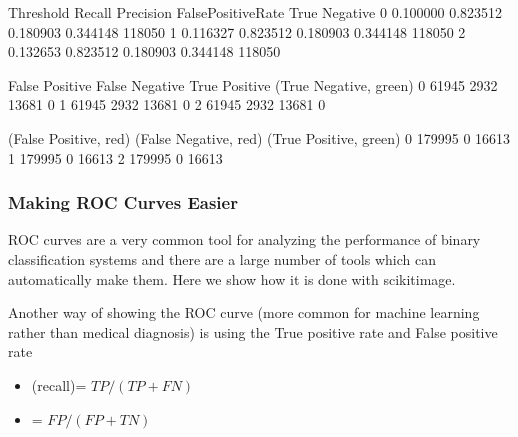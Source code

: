 \documentclass[letterpaper,10pt,english]{sphinxmanual}
\begin{document}
\begin{sphinxVerbatim}[commandchars=\\\{\}]
  
\end{sphinxVerbatim}

\begin{sphinxVerbatim}[commandchars=\\\{\}]
   Threshold    Recall  Precision  False\PYGZus{}Positive\PYGZus{}Rate  True Negative  \PYGZbs{}
0   0.100000  0.823512   0.180903             0.344148         118050   
1   0.116327  0.823512   0.180903             0.344148         118050   
2   0.132653  0.823512   0.180903             0.344148         118050   

   False Positive  False Negative  True Positive  (True Negative, green)  \PYGZbs{}
0           61945            2932          13681                       0   
1           61945            2932          13681                       0   
2           61945            2932          13681                       0   

   (False Positive, red)  (False Negative, red)  (True Positive, green)  
0                 179995                      0                   16613  
1                 179995                      0                   16613  
2                 179995                      0                   16613  
\end{sphinxVerbatim}


\subsubsection{Making ROC Curves Easier}
\label{\detokenize{04-BasicSegmentation_Part2:making-roc-curves-easier}}
\sphinxAtStartPar
ROC curves are a very common tool for analyzing the performance of binary classification systems and there are a large number of tools which can automatically make them. Here we show how it is done with scikit\sphinxhyphen{}image.

\sphinxAtStartPar
Another way of showing the ROC curve (more common for machine learning rather than medical diagnosis) is using the True positive rate and False positive rate
\begin{itemize}
\item {} 
\sphinxAtStartPar
{} (recall)= \(TP/(TP+FN)\)

\item {} 
\sphinxAtStartPar
{} = \(FP/(FP+TN)\)

\end{itemize}
\end{document}
